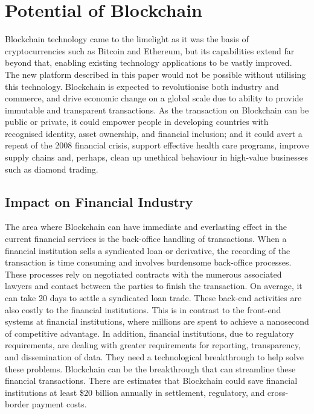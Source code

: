 \section{Potential of Blockchain}
Blockchain technology came to the limelight as it was the basis of cryptocurrencies such as Bitcoin and Ethereum, but its capabilities extend far beyond that, enabling existing technology applications to be vastly improved. The new platform described in this paper would not be possible without utilising this technology. Blockchain is expected to revolutionise both industry and commerce, and drive economic change on a global scale due to ability to provide immutable and transparent transactions.  As the transaction on Blockchain can be public or private, it could empower people in developing countries with recognised identity, asset ownership, and financial inclusion; and it could avert a repeat of the 2008 financial crisis, support effective health care programs, improve supply chains and, perhaps, clean up unethical behaviour in high-value businesses such as diamond trading.\cite{Underwood2016BlockchainBitcoin}

\subsection{Impact on Financial Industry}
The area where Blockchain can have immediate and everlasting effect in the current financial services is the back-office handling of transactions. When a financial institution sells a syndicated loan or derivative, the recording of the transaction is time consuming and involves burdensome back-office processes. These processes rely on negotiated contracts with the numerous associated lawyers and contact between the parties to finish the transaction. On average, it can take 20 days to settle a syndicated loan trade. These back-end activities are also costly to the financial institutions. This is in contrast to the front-end systems at financial institutions, where millions are spent to achieve a nanosecond of competitive advantage. In addition, financial institutions, due to regulatory requirements, are dealing with greater requirements for reporting, transparency, and dissemination of data. They need a technological breakthrough to help solve these problems. Blockchain can be the breakthrough that can streamline these financial transactions. There are estimates that Blockchain could save financial institutions at least \$20 billion annually in settlement, regulatory, and cross-border payment costs.\cite{Fanning2016BlockchainServices}

